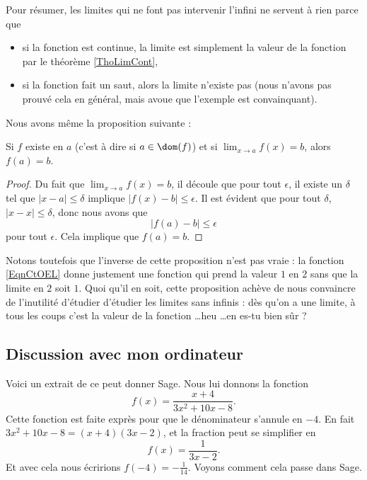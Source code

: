 Pour résumer, les limites qui ne font pas intervenir l'infini ne servent à rien parce que
\begin{itemize}
\item si la fonction est continue, la limite est simplement la valeur de la fonction par le théorème \ref{ThoLimCont},
\item si la fonction fait un saut, alors la limite n'existe pas (nous n'avons pas prouvé cela en général, mais avoue que l'exemple est convainquant).
\end{itemize}
Nous avons même la proposition suivante :
\begin{proposition}     \label{PropExisteLimVql}
Si $f$ existe en $a$ (c'est à dire si $a\in\dom(f)$) et si $\lim_{x\to a}f(x)=b$, alors $f(a)=b$.
\end{proposition}

\begin{proof}
Du fait que $\lim_{x\to a}f(x)=b$, il découle que pour tout $\epsilon$, il existe un $\delta$ tel que $| x-a |\leq \delta$ implique $| f(x)-b |\leq \epsilon$. Il est évident que pour tout $\delta$, $| x-x |\leq \delta$, donc nous avons que 
\[ 
  | f(a)-b |\leq\epsilon
\]
pour tout $\epsilon$. Cela implique que $f(a)=b$.
\end{proof}
Notons toutefois que l'inverse de cette proposition n'est pas vraie : la fonction \eqref{EqnCtOEL} donne justement une fonction qui prend la valeur $1$ en $2$ sans que la limite en $2$ soit $1$. Quoi qu'il en soit, cette proposition achève de nous convaincre de l'inutilité d'étudier d'étudier les limites sans infinis : dès qu'on a une limite, à tous les coups c'est la valeur de la fonction \ldots heu \ldots en es-tu bien sûr ?


\subsection{Discussion avec mon ordinateur}

Voici un extrait de ce peut donner Sage. Nous lui donnons la fonction
\begin{equation}    \label{EqyEHTBZ}
    f(x)=\frac{ x+4 }{ 3x^2+10x-8 }.
\end{equation}
Cette fonction est faite exprès pour que le dénominateur s'annule en \( -4\). En fait \( 3x^2+10x-8=(x+4)(3x-2)\), et la fraction peut se simplifier en
\begin{equation}
    f(x)=\frac{1}{ 3x-2 }.
\end{equation}
Et avec cela nous écririons \( f(-4)=-\frac{1}{ 14 }\). Voyons comment cela passe dans Sage.

